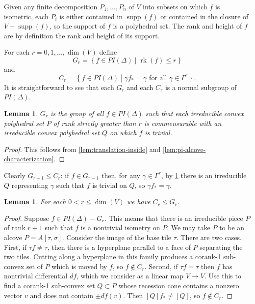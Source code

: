 \documentclass[11pt]{amsart}
\newtheorem{lemma}[theorem]{Lemma}
\numberwithin{table}{section}
\numberwithin{figure}{section}
\theoremstyle{remark}
\providecommand{\set}[1]{\left\lbrace#1\right\rbrace}
\DeclareMathOperator{\rk}{rk}
\DeclareMathOperator{\supp}{supp}
\newcommand\suchthat{ \mathrel{}\middle| \mathrel{}}
\begin{document}
Given any finite decomposition $P_1,\dotsc, P_n$ of $V$ into subsets
on which $f$ is isometric, each $P_i$ is either contained in
$\supp(f)$ or contained in the closure of $V - \supp(f)$, so the
support of $f$ is a polyhedral set. The rank and height of $f$ are by
definition the rank and height of its support.

For each $r=0,1,\dotsc, \dim(V)$ define
\[
  G_r = \set{ f\in PI(\Delta) \suchthat \rk(f) \leq r}
\]
and
\[
  C_r = \set{ f\in PI(\Delta) \suchthat \gamma f_\ast = \gamma \text{ for all } \gamma\in
    \Gamma^r}.
\]
It is straightforward to see that each $G_r$ and each $C_r$ is a normal subgroup of
$PI(\Delta)$.

\begin{lemma} \label{lem:Grform} $G_r$ is the group of all
  $f\in PI(\Delta)$ such that each irreducible convex polyhedral set
  $P$ of rank strictly greater than $r$ is commensurable with an
  irreducible convex polyhedral set $Q$ on which $f$ is trivial.
\end{lemma}
\begin{proof}
  This follows from \cref{lem:translation-inside} and
 \cref{lem:pi-alcove-characterization}. 
\end{proof}

Clearly $G_{r-1}\leq C_r$: if $f\in G_{r-1}$ then, for any
$\gamma \in \Gamma^r$, by \cref{lem:Grform} there is an irreducible $Q$
representing $\gamma$ such that $f$ is trivial on $Q$, so
$\gamma f_\ast = \gamma$.
  
\begin{lemma} \label{lem:firstfiltration}
  For each $0 < r \leq \dim(V)$ we have $C_r \leq G_r$.
\end{lemma}
\begin{proof}
  Suppose $f\in PI(\Delta) - G_r$. This means that there is an
  irreducible piece $P$ of rank $r+1$ such that $f$ is a nontrivial
  isometry on $P$. We may take $P$ to be an alcove
  $P = A[\tau, \sigma]$. Consider the image of the base tile
  $\tau$. There are two cases. First, if $\tau f \neq \tau$, then
  there is a hyperplane parallel to a face of $P$ separating the two
  tiles. Cutting along a hyperplane in this family produces a corank-1
  sub-convex set of $P$ which is moved by $f$, so $f\notin
  C_r$. Second, if $\tau f = \tau$ then $f$ has nontrivial
  differential $df$, which we consider as a linear map $V\to V$. Use
  this to find a corank-1 sub-convex set $Q\subset P$ whose recession
  cone contains a nonzero vector $v$ and does not contain $\pm
  df(v)$. Then $[Q]f_\ast \neq [Q]$, so $f\notin C_r$.
\end{proof}
\end{document}
